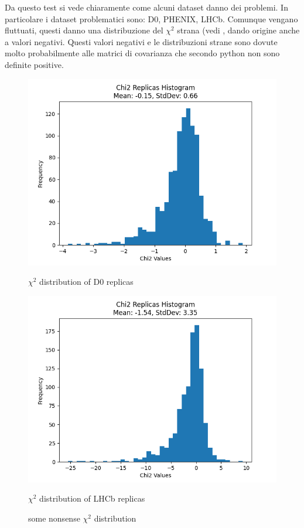 \documentclass{article}
\begin{document}
\begin{itemize}
    Da questo test si vede chiaramente come alcuni dataset danno dei problemi. In particolare i dataset problematici sono: D0, PHENIX, LHCb. Comunque vengano fluttuati, questi danno una distribuzione del $\chi^2$ strana (vedi , dando origine anche a valori negativi. Questi valori negativi e le distribuzioni strane sono dovute molto probabilmente alle matrici di covarianza che secondo python non sono definite positive.
    \begin{figure}[H]
    \centering
    \begin{minipage}{0.45\textwidth}
        \centering
        \includegraphics[width=\textwidth]{Images/D0_X^2_distribution.png}
        \caption{$\chi^2$ distribution of D0 replicas}
    \end{minipage}\hfill
    \begin{minipage}{0.45\textwidth}
        \centering
        \includegraphics[width=\textwidth]{Images/LHCb_X^2_distribution.png}
        \caption{$\chi^2$ distribution of LHCb replicas}
    \end{minipage}
    \caption{some nonsense $\chi^2$ distribution}
    \end{figure}


\end{itemize}
\end{document}
